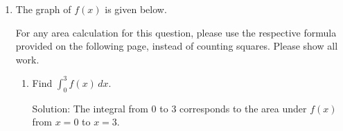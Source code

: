 \documentclass[11pt]{article}
\begin{document}
\begin{enumerate}
\begin{enumerate}
    Suppose there are $7436$ cases at the end of the day on April 1, 2020. Write down an expression involving a definite integral that represents the total number of COVID 19 cases in California at the end of the day on April 20, 2020.

    {\color{blue}Solution: $$7436 + \int_1^{20} r(t) dt$$}

    \vfill
\end{enumerate}


\newpage


\item The graph of $f(x)$ is given below.

\begin{center}
    \end{center}

For any area calculation for this question, please use the respective formula provided on the following page, instead of counting squares. Please show all work.

\begin{enumerate}
    \item Find $\displaystyle\int_0^3 f(x)\,dx$.\\
    {\color{blue}%
    Solution: The integral from $0$ to $3$ corresponds to the area under $f(x)$ from $x=0$ to $x=3$. 

}
\end{enumerate}
\end{enumerate}
\end{document}
